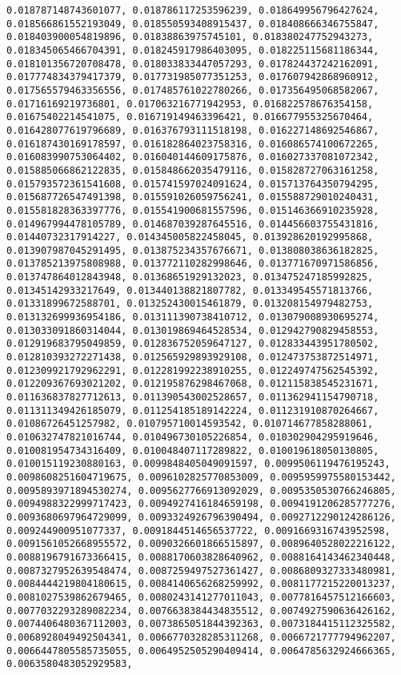 \documentclass[11pt]{article}
\begin{document}
\begin{Verbatim}[commandchars=\\\{\}]
0.018787148743601077, 0.018786117253596239, 0.018649956796427624, 0.018566861552193049, 0.018550593408915437, 0.018408666346755847, 0.018403900054819896, 0.01838863975745101, 0.018380247752943273, 0.018345065466704391, 0.018245917986403095, 0.018225115681186344, 0.018101356720708478, 0.018033833447057293, 0.017824437242162091, 0.017774834379417379, 0.017731985077351253, 0.017607942868960912, 0.017565579463356556, 0.017485761022780266, 0.017356495068582067, 0.01716169219736801, 0.017063216771942953, 0.016822578676354158, 0.01675402214541075, 0.016719149463396421, 0.016677955325670464, 0.016428077619796689, 0.016376793111518198, 0.016227148692546867, 0.016187430169178597, 0.016182864023758316, 0.016086574100672265, 0.016083990753064402, 0.016040144609175876, 0.016027337081072342, 0.015885066862122835, 0.015848662035479116, 0.015828727063161258, 0.015793572361541608, 0.015741597024091624, 0.015713764350794295, 0.015687726547491398, 0.015591026059756241, 0.015588729010240431, 0.015581828363397776, 0.015541900681557596, 0.015146366910235928, 0.014967994478105789, 0.014687039287645516, 0.014456603755431816, 0.01440732317914227, 0.014345005822458045, 0.013928620192995868, 0.013907987045291495, 0.013875234357676671, 0.013808038636182825, 0.013785213975808988, 0.013772110282998646, 0.013771670971586856, 0.013747864012843948, 0.01368651929132023, 0.013475247185992825, 0.01345142933217649, 0.013440138821807782, 0.013349545571813766, 0.01331899672588701, 0.013252430015461879, 0.013208154979482753, 0.013132699936954186, 0.013111390738410712, 0.013079008930695274, 0.013033091860314044, 0.013019869464528534, 0.012942790829458553, 0.012919683795049859, 0.012836752059647127, 0.012833443951780502, 0.012810393272271438, 0.012565929893929108, 0.012473753872514971, 0.012309921792962291, 0.012281992238910255, 0.012249747562545392, 0.012209367693021202, 0.012195876298467068, 0.012115838545231671, 0.011636837827712613, 0.011390543002528657, 0.011362941154790718, 0.011311349426185079, 0.011254185189142224, 0.011231910870264667, 0.01086726451257982, 0.010795710014593542, 0.010714677858288061, 0.010632747821016744, 0.010496730105226854, 0.010302904295919646, 0.010081954734316409, 0.010048407117289822, 0.010019618050130805, 0.010015119230880163, 0.0099848405049091597, 0.0099506119476195243, 0.0098608251604719675, 0.0096102825770853009, 0.0095959975580153442, 0.0095893971894530274, 0.0095627766913092029, 0.0095350530766246805, 0.0094988322999717423, 0.0094927416184659198, 0.0094191206285777276, 0.0093680697964729099, 0.0093324926796390494, 0.0092712290124286126, 0.009244900951077337, 0.0091844514656537722, 0.0091669316743952598, 0.0091561052668955572, 0.0090326601866515897, 0.0089640528022216122, 0.0088196791673366415, 0.0088170603828640962, 0.0088164143462340448, 0.0087327952639548474, 0.0087259497527361427, 0.0086809327333480981, 0.0084444219804180615, 0.0084140656268259992, 0.0081177215220013237, 0.0081027539862679465, 0.0080243141277011043, 0.0077816457512166603, 0.0077032293289082234, 0.0076638384434835512, 0.0074927590636426162, 0.0074406480367112003, 0.0073865051844392363, 0.0073184415112325582, 0.0068928049492504341, 0.0066770328285311268, 0.0066721777794962207, 0.0066447805585735055, 0.0064952505290409414, 0.0064785632924666365, 0.0063580483052929583, 
\end{Verbatim}
\end{document}
